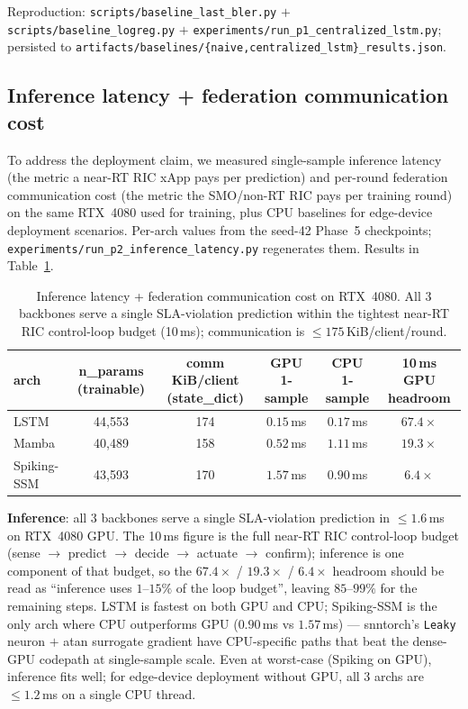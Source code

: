 \documentclass[journal]{IEEEtran}
\begin{document}
Reproduction: \lstinline|scripts/baseline_last_bler.py| $+$ \lstinline|scripts/baseline_logreg.py| $+$ \lstinline|experiments/run_p1_centralized_lstm.py|; persisted to \lstinline|artifacts/baselines/{naive,centralized_lstm}_results.json|.

\subsection{Inference latency + federation communication cost}\label{sec:deployment-cost}

To address the deployment claim, we measured single-sample inference latency (the metric a near-RT RIC xApp pays per prediction) and per-round federation communication cost (the metric the SMO/non-RT RIC pays per training round) on the same RTX~4080 used for training, plus CPU baselines for edge-device deployment scenarios. Per-arch values from the seed-42 Phase~5 checkpoints; \lstinline|experiments/run_p2_inference_latency.py| regenerates them. Results in Table~\ref{tab:deployment-cost}.

\begin{table}[t]
\caption{Inference latency + federation communication cost on RTX~4080. All 3 backbones serve a single SLA-violation prediction within the tightest near-RT RIC control-loop budget (10\,ms); communication is $\leq 175$\,KiB/client/round.}
\label{tab:deployment-cost}
\centering
\begin{tabular}{@{}lccccc@{}}
\toprule
arch & n\_params (trainable) & comm KiB/client (state\_dict) & GPU 1-sample & CPU 1-sample & 10\,ms GPU headroom \\
\midrule
LSTM        & 44{,}553 & 174 & $\mathbf{0.15}$\,ms & $0.17$\,ms & $\mathbf{67.4\times}$ \\
Mamba       & 40{,}489 & 158 & $0.52$\,ms          & $1.11$\,ms & $19.3\times$          \\
Spiking-SSM & 43{,}593 & 170 & $1.57$\,ms          & $\mathbf{0.90}$\,ms & $6.4\times$           \\
\bottomrule
\end{tabular}
\end{table}

\textbf{Inference}: all 3 backbones serve a single SLA-violation prediction in $\leq 1.6$\,ms on RTX~4080 GPU. The 10\,ms figure is the full near-RT RIC control-loop budget (sense $\rightarrow$ predict $\rightarrow$ decide $\rightarrow$ actuate $\rightarrow$ confirm); inference is one component of that budget, so the $67.4\times$ / $19.3\times$ / $6.4\times$ headroom should be read as ``inference uses $1$--$15\%$ of the loop budget'', leaving $85$--$99\%$ for the remaining steps. LSTM is fastest on both GPU and CPU; Spiking-SSM is the only arch where CPU outperforms GPU ($0.90$\,ms vs $1.57$\,ms) --- snntorch's \lstinline|Leaky| neuron $+$ atan surrogate gradient have CPU-specific paths that beat the dense-GPU codepath at single-sample scale. Even at worst-case (Spiking on GPU), inference fits well; for edge-device deployment without GPU, all 3 archs are $\leq 1.2$\,ms on a single CPU thread.
\end{document}
